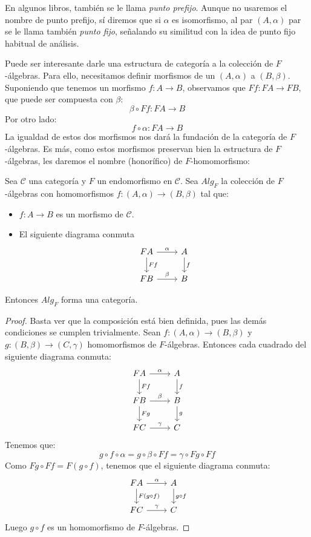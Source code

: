 \documentclass[12pt, twoside]{book}
\newcommand{\newterm}[1]{\index{#1}\emph{#1}}
\newcommand{\cat}{{\mathcal{C}}}
\begin{document}
En algunos libros, también se le llama \newterm{punto prefijo}.
Aunque no usaremos el nombre de punto prefijo, sí diremos que si $\alpha$ es isomorfismo, al par $(A,\alpha)$ par se le llama también \newterm{punto fijo}, señalando su similitud con la idea de punto fijo habitual de análisis.

Puede ser interesante darle una estructura de categoría a la colección de $F$-álgebras.
Para ello, necesitamos definir morfismos de un $(A,\alpha)$ a $(B,\beta)$.
Suponiendo que tenemos un morfismo $f \colon A \to B$, observamos que $F f \colon F A \to F B$, que puede ser compuesta con $\beta$:
\[ \beta \circ F f \colon F A \to B \]
Por otro lado:
\[ f \circ \alpha \colon F A \to B \]
La igualdad de estos dos morfismos nos dará la fundación de la categoría de $F$-álgebras.
Es más, como estos morfismos preservan bien la estructura de $F$-álgebras, les daremos el nombre (honorífico) de $F$-homomorfismo:

\begin{proposition}\label{prop:fmorfismo}
Sea $\cat$ una categoría y $F$ un endomorfismo en $\cat$.
Sea $Alg_F$ la colección de $F$-álgebras con homomorfismos $f \colon (A,\alpha) \to (B,\beta)$ tal que:
\begin{itemize}
\item $f \colon A \to B$ es un morfismo de $\cat$.
\item El siguiente diagrama conmuta
\[
\begin{tikzcd}
F A \arrow[r,"\alpha"] \arrow[d,"F f"] & A \arrow[d,"f"]\\
F B \arrow[r,"\beta"] & B
\end{tikzcd}
\]
\end{itemize}
Entonces $Alg_F$ forma una categoría.
\end{proposition}
\begin{proof}
Basta ver que la composición está bien definida, pues las demás condiciones se cumplen trivialmente.
Sean $f \colon (A,\alpha) \to (B,\beta)$ y $g \colon (B,\beta) \to (C,\gamma)$ homomorfismos de $F$-álgebras.
Entonces cada cuadrado del siguiente diagrama conmuta:
\[
\begin{tikzcd}
F A \arrow[r,"\alpha"] \arrow[d,"F f"] & A \arrow[d,"f"]\\
F B \arrow[r,"\beta"] \arrow[d,"F g"] & B \arrow[d,"g"]\\
F C \arrow[r,"\gamma"] & C
\end{tikzcd}
\]
Tenemos que:
\[ g \circ f \circ \alpha = g \circ \beta \circ F f = \gamma \circ F g \circ F f \]
Como $F g \circ F f = F (g \circ f)$, tenemos que el siguiente diagrama conmuta:
\[
\begin{tikzcd}
F A \arrow[r,"\alpha"] \arrow[d,"F (g \circ f)"] & A \arrow[d,"g \circ f"]\\
F C \arrow[r,"\gamma"] & C
\end{tikzcd}
\]
Luego $g \circ f$ es un homomorfismo de $F$-álgebras.
\end{proof}
\end{document}
